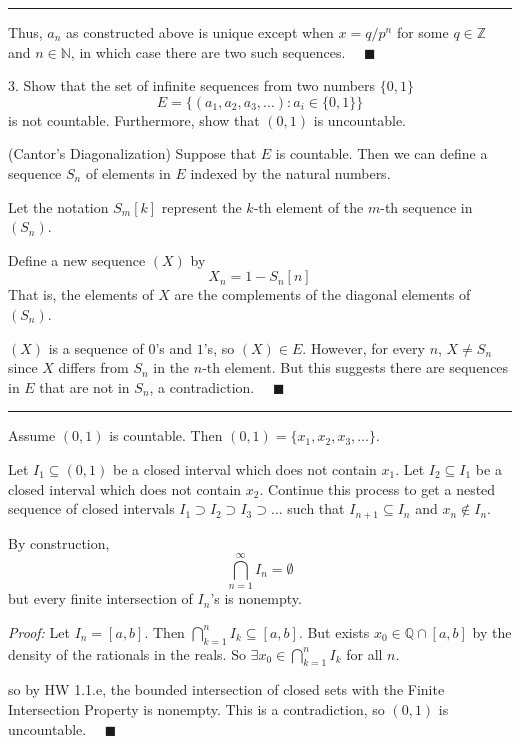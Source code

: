 \documentclass[12pt]{article}
\newcommand{\Z}{\mathbb{Z}}
\newcommand{\N}{\mathbb{N}}
\newcommand{\Q}{\mathbb{Q}}
\newcommand{\qed}{\quad \blacksquare}
\newcommand{\sub}{\subseteq}
\renewcommand{\div}{\vspace*{10pt}\hrule \vspace*{10pt}}
\newenvironment*{proof}[1][blue]{
    \begin{tcolorbox}[
        parbox=false,
        colback=#1!5!white,
        colframe=#1!75!black,
        coltext=#1,
        breakable
    ]}
    {\end{tcolorbox}}
\begin{document}
        \div 
        
        Thus, $a_n$ as constructed above is unique except when $x = q/p^n$ for some $q \in \Z$ and $n \in \N$, in which case there are two such sequences. $\qed$

    \color{black}

\pagebreak

3. Show that the set of infinite sequences from two numbers $\{0, 1\}$ 
\[E = \{(a_1, a_2, a_3, \dots): a_i \in \{0, 1\}\}\]
is not countable. Furthermore, show that $(0, 1)$ is uncountable.

    \color{blue}
        (Cantor's Diagonalization) Suppose that $E$ is countable. Then we can define a sequence $S_n$ of elements in $E$ indexed by the natural numbers. 

        Let the notation $S_m[k]$ represent the $k$-th element of the $m$-th sequence in $(S_n)$. 

        Define a new sequence $(X)$ by 
        \[X_n = 1 - S_n[n]\] 
        That is, the elements of $X$ are the complements of the diagonal elements of $(S_n)$. 

        $(X)$ is a sequence of $0$'s and $1$'s, so $(X) \in E$. However, for every $n$, $X \neq S_n$ since $X$ differs from $S_n$ in the $n$-th element. But this suggests there are sequences in $E$ that are not in $S_n$, a contradiction. $\qed$

        \div 

        Assume $(0, 1)$ is countable. Then $(0, 1) = \{x_1, x_2, x_3, \dots\}$.

        Let $I_1 \sub (0, 1)$ be a closed interval which does not contain $x_1$. Let $I_2 \sub I_1$ be a closed interval which does not contain $x_2$. Continue this process to get a nested sequence of closed intervals $I_1 \supset I_2 \supset I_3 \supset \dots$ such that $I_{n + 1} \sub I_n$ and $x_n \not\in I_n$. 

        By construction, 
        \[\bigcap_{n=1}^{\infty} I_n = \emptyset\]
        but every finite intersection of $I_n$'s is nonempty. 

        \begin{proof}
            \emph{Proof:} Let $I_n = [a, b]$. Then $\bigcap_{k=1}^n I_k \sub [a, b]$. But exists $x_0 \in \Q \cap [a, b]$ by the density of the rationals in the reals. So $\exists x_0 \in \bigcap_{k=1}^n I_k$ for all $n$.
        \end{proof}
        
        so by HW 1.1.e, the bounded intersection of closed sets with the Finite Intersection Property is nonempty. This is a contradiction, so $(0, 1)$ is uncountable. $\qed$ 
\end{document}
